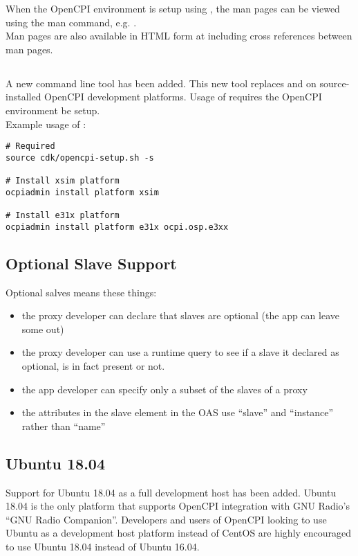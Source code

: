 When the OpenCPI environment is setup using , the man pages can be viewed using the man command, e.g. .\\

Man pages are also available in HTML form at  including cross references between man pages.

\subsection{}
\label{sec:20_ocpiadmin}
A new command line tool  has been added. This new tool replaces  and  on source-installed OpenCPI development platforms. Usage of  requires the OpenCPI environment be setup.\\
Example usage of :
\begin{lstlisting}
# Required
source cdk/opencpi-setup.sh -s

# Install xsim platform
ocpiadmin install platform xsim

# Install e31x platform
ocpiadmin install platform e31x ocpi.osp.e3xx
\end{lstlisting}

\subsection{Optional Slave Support}
\label{sec:20_optional_slave_support}
Optional salves means these things:
\begin{itemize}
\item the proxy developer can declare that slaves are optional (the app can leave some out)
\item the proxy developer can use a runtime query to see if a slave it declared as optional, is in fact present or not.
\item the app developer can specify only a subset of the slaves of a proxy
\item the attributes in the slave element in the OAS use ``slave'' and ``instance'' rather than ``name''
\end{itemize}

\subsection{Ubuntu 18.04}
\label{sec:20_ubuntu18}
Support for Ubuntu 18.04 as a full development host has been added. Ubuntu 18.04 is the only platform that supports OpenCPI integration with GNU Radio's ``GNU Radio Companion''. Developers and users of OpenCPI looking to use Ubuntu as a development host platform instead of CentOS are highly encouraged to use Ubuntu 18.04 instead of Ubuntu 16.04.

